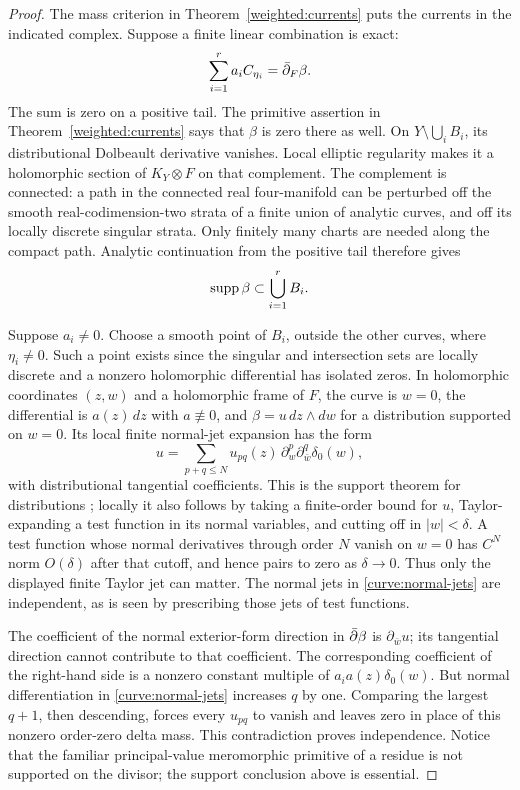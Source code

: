 \begin{proof}
The mass criterion in Theorem~\ref{weighted:currents} puts the currents
in the indicated complex.
Suppose a finite linear combination is exact:
\[
 \sum_{i=1}^r a_i C_{\eta_i}=\bar\partial_F\beta.
\]
The sum is zero on a positive tail.  The primitive assertion in
Theorem~\ref{weighted:currents} says that $\beta$ is zero there as well.
On $Y\setminus\bigcup_iB_i$, its distributional Dolbeault derivative
vanishes.  Local elliptic regularity makes it a holomorphic section of
$K_Y\otimes F$ on that complement.  The complement is connected: a
path in the connected real four-manifold can be perturbed off the
smooth real-codimension-two strata of a finite union of analytic
curves, and off its locally discrete singular strata.  Only finitely
many charts are needed along the compact path.  Analytic continuation
from the positive tail therefore gives
\[
 \operatorname{supp}\beta\subset\bigcup_{i=1}^rB_i.
\]

Suppose $a_i\ne0$.  Choose a smooth point of $B_i$, outside the other
curves, where $\eta_i\ne0$.  Such a point exists since the singular
and intersection sets are locally discrete and a nonzero holomorphic
differential has isolated zeros.  In holomorphic coordinates $(z,w)$
and a holomorphic frame of $F$, the curve is $w=0$, the differential is
$a(z)\,dz$ with $a\not\equiv0$, and
$\beta=u\,dz\wedge dw$ for a distribution supported on $w=0$.
Its local finite normal-jet expansion has the form
\begin{equation}\label{curve:normal-jets}
 u=\sum_{p+q\le N}u_{pq}(z)\,
       \partial_w^p\partial_{\bar w}^q\delta_0(w),
\end{equation}
with distributional tangential coefficients.  This is the support
theorem for distributions \cite[Theorem~2.3.5]{Hormander1990}; locally it also follows
by taking a finite-order bound for $u$, Taylor-expanding a test function
in its normal variables, and cutting off in $|w|<\delta$.  A test
function whose normal derivatives through order $N$ vanish on $w=0$
has $C^N$ norm $O(\delta)$ after that cutoff, and hence pairs to zero
as $\delta\to0$.  Thus only the displayed finite Taylor jet can matter.
The normal jets in \eqref{curve:normal-jets} are independent, as is
seen by prescribing those jets of test functions.

The coefficient of the normal exterior-form direction in
$\bar\partial\beta$ is $\partial_{\bar w}u$; its tangential direction cannot
contribute to that coefficient.  The corresponding coefficient of the
right-hand side is a nonzero constant multiple of
$a_i a(z)\delta_0(w)$.  But normal differentiation in
\eqref{curve:normal-jets} increases $q$ by one.  Comparing the largest
$q+1$, then descending, forces every $u_{pq}$ to vanish and leaves
zero in place of this nonzero order-zero delta mass.  This contradiction
proves independence.  Notice that the familiar principal-value
meromorphic primitive of a residue is not supported on the divisor;
the support conclusion above is essential.


\end{proof}
